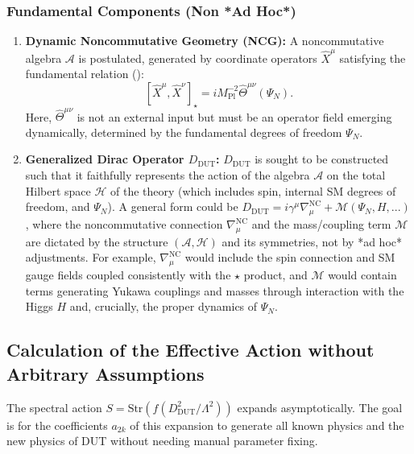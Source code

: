 \documentclass[11pt, a4paper]{article}
\theoremstyle{remark}
\begin{document}
\subsubsection{Fundamental Components (Non *Ad Hoc*)}
\begin{enumerate}
    \item \textbf{Dynamic Noncommutative Geometry (NCG):}
        A noncommutative algebra \( \mathcal{A} \) is postulated, generated by coordinate operators \( \hat{X}^\mu \) satisfying the fundamental relation ():
        \[
        [\hat{X}^\mu, \hat{X}^\nu]_\star = iM_{\text{Pl}}^{-2} \hat{\Theta}^{\mu\nu}(\Psi_N).
        \]
        Here, \( \hat{\Theta}^{\mu\nu} \) is not an external input but must be an operator field emerging dynamically, determined by the fundamental degrees of freedom \( \Psi_N \).

    \item \textbf{Generalized Dirac Operator \( D_{\text{DUT}} \):}
        \( D_{\text{DUT}} \) is sought to be constructed such that it faithfully represents the action of the algebra \( \mathcal{A} \) on the total Hilbert space \( \mathcal{H} \) of the theory (which includes spin, internal SM degrees of freedom, and \( \Psi_N \)). A general form could be \( D_{\text{DUT}} = i\gamma^\mu \nabla_\mu^{\text{NC}} + \mathcal{M}(\Psi_N, H, ...) \), where the noncommutative connection \( \nabla_\mu^{\text{NC}} \) and the mass/coupling term \( \mathcal{M} \) are dictated by the structure \( (\mathcal{A}, \mathcal{H}) \) and its symmetries, not by *ad hoc* adjustments. For example, \( \nabla_\mu^{\text{NC}} \) would include the spin connection and SM gauge fields coupled consistently with the \( \star \) product, and \( \mathcal{M} \) would contain terms generating Yukawa couplings and masses through interaction with the Higgs \( H \) and, crucially, the proper dynamics of \( \Psi_N \).
\end{enumerate}

\subsection{Calculation of the Effective Action without Arbitrary Assumptions}
The spectral action \( S = \text{Str}(f(D_{\text{DUT}}^2/\Lambda^2)) \) expands asymptotically. The goal is for the coefficients \( a_{2k} \) of this expansion to generate all known physics and the new physics of DUT without needing manual parameter fixing.
\end{document}
